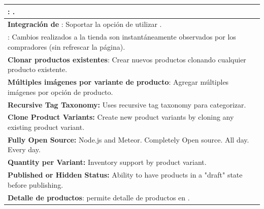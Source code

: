 \begin{table}[h!]
\begin{tabular}{ |L{0.6\paperwidth}|L{0.1\paperwidth}|}
\\ \hline
	\textbf{ \googleanalytics}: \outofthebox \googleanalytics \event \tracking.&
		
\\ \hline
	\textbf{ Integración de \paypal}: Soportar la opción de utilizar \paypal \checkoutCOM.&
		
\\ \hline
	\textbf{\realtime \itemupdates}: Cambios realizados a la tienda son instantáneamente observados por los compradores (sin refrescar la página).&
		
\\ \hline
	\textbf{Clonar productos existentes}: Crear nuevos productos clonando cualquier producto existente.&
		
\\ \hline
	\textbf{Múltiples imágenes por variante de producto}: Agregar múltiples imágenes por opción de producto.&
		
\\ \hline
	\textbf{ Recursive Tag Taxonomy:} Uses recursive tag taxonomy para categorizar.&	
		
\\ \hline
	 \textbf{ Clone Product Variants:} Create new product variants by cloning any existing product variant.&
	
\\ \hline
	\textbf{ Fully Open Source:} Node.js and Meteor. Completely Open source. All day. Every day.&
	
\\ \hline
	\textbf{ Quantity per Variant:} Inventory support by product variant.&
	
\\ \hline
	\textbf{ Published or Hidden Status:} Ability to have products in a "draft" state before publishing.&
	
\\ \hline
	\textbf{ Detalle de productos}: permite detalle de productos en \keyValue \listhighlevel .&
	

\end{tabular}
\end{table}

